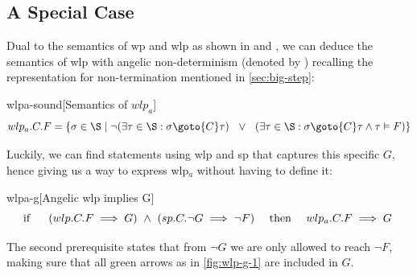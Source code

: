 \subsection{A Special Case} %
Dual to the semantics of wp and wlp as shown in  and , we can deduce the semantics of wlp with angelic non-determinism (denoted by ) recalling the representation for non-termination mentioned in \autoref{sec:big-step}: 
\begin{statement}{wlpa-sound}[Semantics of $wlp_a$]
\ \vspace{-1.5mm}
\[
wlp_a.C.F = \{ \sigma\in\S \mid
\neg(\exists \tau\in\S: \sigma\goto{C}\tau) \ \ \vee\ \ 
(\exists \tau\in\S: \sigma\goto{C}\tau\wedge  \tau\vDash F)
 \}
\]
\end{statement}

Luckily, we can find statements using wlp and sp that captures this specific $G$, hence giving us a way to express wlp$_a$ without having to define it: 
\begin{lemma}{wlpa-g}[Angelic wlp implies G]
\ \\ \vspace{-3mm}
	\[\hspace{-2mm}
	\text{ if \ \ \ \ } 
	(wlp.C.F\implies G)
	\ \wedge\ 
	(sp.C.\neg G \implies \neg F) 
	\text{\ \ \ \  then\ \ \ \  } 
	wlp_a.C.F \implies G
	\] 
	\label{lem:wlp-g}
\end{lemma}
The second prerequisite  states that from $\neg G$ we are only allowed to reach $\neg F$, making sure that all green arrows as in \autoref{fig:wlp-g-1} are included in $G$. 

